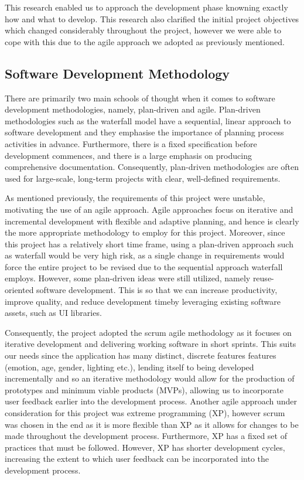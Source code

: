 \documentclass[12pt, a4paper]{article}
\newcommand{\np}
    {
    \vskip 0.4cm
    }
\begin{document}
This research enabled us to approach the development phase knowning exactly how and what to develop. This research also clarified the initial project objectives which changed considerably throughout the project, however we were able to cope with this due to the agile approach we adopted as previously mentioned.

\subsection{Software Development Methodology}
\label{sdm}

There are primarily two main schools of thought when it comes to software development methodologies, namely, plan-driven and agile. Plan-driven methodologies such as the waterfall model have a sequential, linear approach to software development and they emphasise the importance of planning process activities in advance. Furthermore, there is a fixed specification before development commences, and there is a large emphasis on producing comprehensive documentation. Consequently, plan-driven methodologies are often used for large-scale, long-term projects with clear, well-defined requirements. 
\np
As mentioned previously, the requirements of this project were unstable, motivating the use of an agile approach. Agile approaches focus on iterative and incremental development with flexible and adaptive planning, and hence is clearly the more appropriate methodology to employ for this project. Moreover, since this project has a relatively short time frame, using a plan-driven approach such as waterfall would be very high risk, as a single change in requirements would force the entire project to be revised due to the sequential approach waterfall employs. However, some plan-driven ideas were still utilized, namely reuse-oriented software development. This is so that we can increase productivity, improve quality, and reduce development timeby leveraging existing software assets, such as UI libraries.
\np
Consequently, the project adopted the scrum agile methodology as it focuses on iterative development and delivering working software in short sprints. This suits our needs since the application has many distinct, discrete features features (emotion, age, gender, lighting etc.), lending itself to being developed incrementally and so an iterative methodology would allow for the production of prototypes and minimum viable products (MVPs), allowing us to incorporate user feedback earlier into the development process. Another agile approach under consideration for this project was extreme programming (XP), however scrum was chosen in the end as it is  more flexible than XP as it allows for changes to be made throughout the development process. Furthermore, XP has a fixed set of practices that must be followed. However, XP has shorter development cycles, increasing the extent to which user feedback can be incorporated into the development process. 
\end{document}
